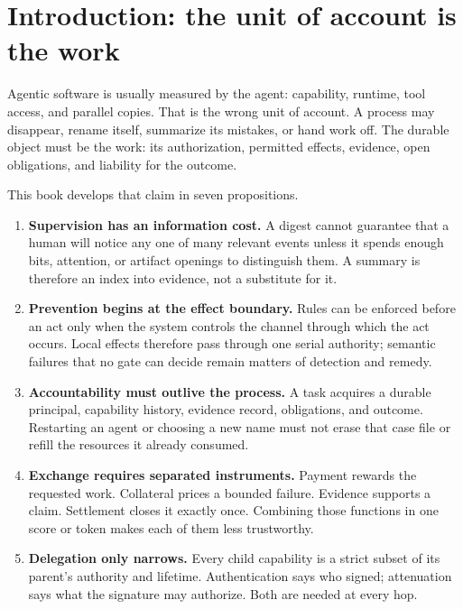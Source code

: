 \documentclass[11pt,a4paper]{article}
\begin{document}
\section{Introduction: the unit of account is the work}

Agentic software is usually measured by the agent: capability, runtime, tool
access, and parallel copies. That is the wrong unit of account. A process may
disappear, rename itself, summarize its mistakes, or hand work off. The durable
object must be the work: its authorization, permitted effects, evidence, open
obligations, and liability for the outcome.

This book develops that claim in seven propositions.

\begin{enumerate}[leftmargin=2.1em,itemsep=2pt,topsep=4pt]
  \item \textbf{Supervision has an information cost.} A digest cannot guarantee
  that a human will notice any one of many relevant events unless it spends
  enough bits, attention, or artifact openings to distinguish them. A summary
  is therefore an index into evidence, not a substitute for it.

  \item \textbf{Prevention begins at the effect boundary.} Rules can be enforced
  before an act only when the system controls the channel through which the act
  occurs. Local effects therefore pass through one serial authority; semantic
  failures that no gate can decide remain matters of detection and remedy.

  \item \textbf{Accountability must outlive the process.} A task acquires a
  durable principal, capability history, evidence record, obligations, and
  outcome. Restarting an agent or choosing a new name must not erase that case
  file or refill the resources it already consumed.

  \item \textbf{Exchange requires separated instruments.} Payment rewards the
  requested work. Collateral prices a bounded failure. Evidence supports a
  claim. Settlement closes it exactly once. Combining those functions in one
  score or token makes each of them less trustworthy.

  \item \textbf{Delegation only narrows.} Every child capability is a strict
  subset of its parent's authority and lifetime. Authentication says who signed;
  attenuation says what the signature may authorize. Both are needed at every
  hop.


\end{enumerate}
\end{document}
